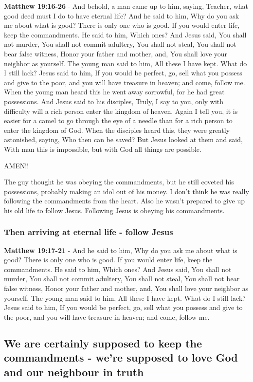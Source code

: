 \documentclass[11pt]{article}
\begin{document}
\textbf{Matthew 19:16-26} - And behold, a man came up to him, saying, Teacher, what good deed must I do to have eternal life? And he said to him, Why do you ask me about what is good? There is only one who is good. If you would enter life, keep the commandments. He said to him, Which ones? And Jesus said, You shall not murder, You shall not commit adultery, You shall not steal, You shall not bear false witness, Honor your father and mother, and, You shall love your neighbor as yourself. The young man said to him, All these I have kept. What do I still lack? Jesus said to him, If you would be perfect, go, sell what you possess and give to the poor, and you will have treasure in heaven; and come, follow me. When the young man heard this he went away sorrowful, for he had great possessions. And Jesus said to his disciples, Truly, I say to you, only with difficulty will a rich person enter the kingdom of heaven. Again I tell you, it is easier for a camel to go through the eye of a needle than for a rich person to enter the kingdom of God. When the disciples heard this, they were greatly astonished, saying, Who then can be saved? But Jesus looked at them and said, With man this is impossible, but with God all things are possible.

AMEN!!

The guy thought he was obeying the commandments, but he still coveted his possessions, probably making an idol out of his money.
I don't think he was really following the commandments from the heart.
Also he wasn't prepared to give up his old life to follow Jesus.
Following Jesus is obeying his commandments.

\subsubsection{Then arriving at eternal life - follow Jesus}
\label{sec:org353a59b}
\textbf{Matthew 19:17-21} - And he said to him, Why do you ask me about what is good? There is only one who is good. If you would enter life, keep the commandments. He said to him, Which ones? And Jesus said, You shall not murder, You shall not commit adultery, You shall not steal, You shall not bear false witness, Honor your father and mother, and, You shall love your neighbor as yourself. The young man said to him, All these I have kept. What do I still lack? Jesus said to him, If you would be perfect, go, sell what you possess and give to the poor, and you will have treasure in heaven; and come, follow me.

\subsection{We are certainly supposed to keep the commandments - we're supposed to love God and our neighbour in truth}
\label{sec:org09d5aff}
\end{document}

